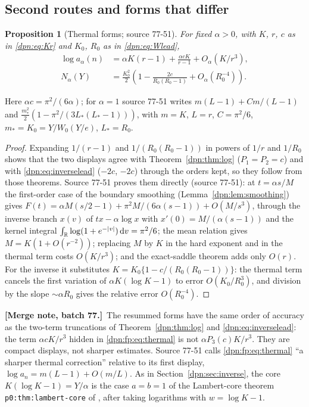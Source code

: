 \documentclass[11pt]{article}
\numberwithin{equation}{section}
\newtheorem{proposition}[theorem]{Proposition}
\theoremstyle{definition}\newtheorem{definition}[theorem]{Definition}
\theoremstyle{remark}\newtheorem{remark}[theorem]{Remark}
\newcommand{\dd}{\,\mathrm d}\newcommand{\ii}{\mathrm i}
\newcommand{\src}[1]{\textup{(source #1)}}
\newcommand{\mergenotec}[1]{\par\smallskip\noindent\textbf{[Merge note, batch 77.]}\ #1\par\smallskip}
\begin{document}
\subsection{Second routes and forms that differ}\label{dpn:fp:sec:routes}
\begin{proposition}[Thermal forms; source 77-51]\label{dpn:fp:prop:thermal}
For fixed $\alpha>0$, with $K$, $r$, $c$ as in \eqref{dpn:eq:Kr} and $K_0$,
$R_0$ as in \eqref{dpn:eq:Wlead},
\begin{align}
 \log a_\alpha(n)&=\alpha K(r-1)+\frac{\alpha cK}{r-1}+O_\alpha(K/r^3),
 \label{dpn:fp:eq:thermal}\\
 N_\alpha(Y)&=\frac{K_0^2}{2}\left(1-\frac{2c}{R_0(R_0-1)}
 +O_\alpha(R_0^{-4})\right).\label{dpn:fp:eq:thermalinv}
\end{align}
\end{proposition}
Here $\alpha c=\pi^2/(6\alpha)$; for $\alpha=1$ source 77-51 writes
$m(L-1)+Cm/(L-1)$ and $\frac{m_*^2}2(1-\pi^2/(3L_*(L_*-1)))$, with $m=K$,
$L=r$, $C=\pi^2/6$, $m_*=K_0=Y/W_0(Y/e)$, $L_*=R_0$.
\begin{proof}
Expanding $1/(r-1)$ and $1/(R_0(R_0-1))$ in powers of $1/r$ and $1/R_0$ shows
that the two displays agree with Theorem~\ref{dpn:thm:log} ($P_1=P_2=c$) and
with \eqref{dpn:eq:inverselead} ($-2c$, $-2c$) through the orders kept, so
they follow from those theorems.  Source 77-51 proves them directly
\src{77-51}: at $t=\alpha s/M$ the first-order case of the boundary smoothing
(Lemma~\ref{dpn:lem:smoothing}) gives $F(t)=\alpha M(s/2-1)+\pi^2M/(6\alpha(s-1))
+O(M/s^3)$, through the inverse branch $x(v)$ of $tx-\alpha\log x$ with
$x'(0)=M/(\alpha(s-1))$ and the kernel integral
$\int_\R\log(1+e^{-|v|})\dd v=\pi^2/6$; the mean relation gives
$M=K(1+O(r^{-2}))$; replacing $M$ by $K$ in the hard exponent and in the
thermal term costs $O(K/r^3)$; and the exact-saddle theorem adds only
$O(r)$.  For the inverse it substitutes $K=K_0\{1-c/(R_0(R_0-1))\}$: the
thermal term cancels the first variation of $\alpha K(\log K-1)$ to error
$O(K_0/R_0^3)$, and division by the slope $\sim\alpha R_0$ gives the relative
error $O(R_0^{-4})$.
\end{proof}
\mergenotec{The resummed forms have the same order of accuracy as the
two-term truncations of Theorem~\ref{dpn:thm:log} and \eqref{dpn:eq:inverselead}:
the term $\alpha cK/r^3$ hidden in \eqref{dpn:fp:eq:thermal} is not $\alpha
P_3(c)K/r^3$.  They are compact displays, not sharper estimates.  Source 77-51
calls \eqref{dpn:fp:eq:thermal} ``a sharper thermal correction'' relative to its
first display, $\log a_n=m(L-1)+O(m/L)$.  As in Section~\ref{dpn:sec:inverse},
the core $K(\log K-1)=Y/\alpha$ is the case $a=b=1$ of the Lambert-core
theorem \texttt{p0:thm:lambert-core} of \cite{tai}, after taking logarithms
with $w=\log K-1$.}
\end{document}
